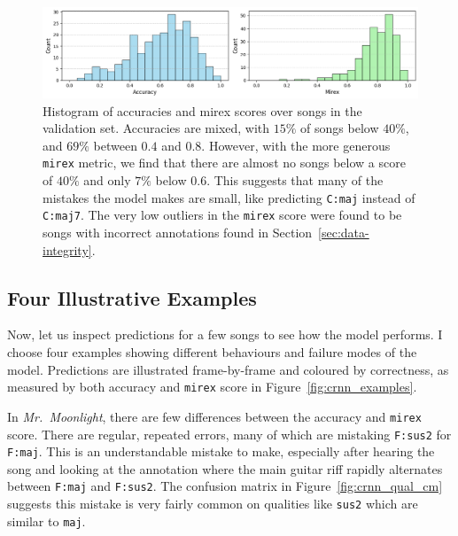 \begin{figure}[ht]
    \centering
    \includegraphics[width=1.0\textwidth]{figures/accuracy_mirex_histograms.png}
    \caption{Histogram of accuracies and mirex scores over songs in the validation set. Accuracies are mixed, with $15\%$ of songs below $40\%$, and $69\%$ between $0.4$ and $0.8$. However, with the more generous \texttt{mirex} metric, we find that there are almost no songs below a score of $40\%$ and only $7\%$ below $0.6$. This suggests that many of the mistakes the model makes are small, like predicting \texttt{C:maj} instead of \texttt{C:maj7}. The very low outliers in the \texttt{mirex} score were found to be songs with incorrect annotations found in Section~\ref{sec:data-integrity}.}\label{fig:crnn_song_hist}
\end{figure}

\subsection{Four Illustrative Examples}\label{sec:crnn_examples}

Now, let us inspect predictions for a few songs to see how the model performs. I choose four examples showing different behaviours and failure modes of the model. Predictions are illustrated frame-by-frame and coloured by correctness, as measured by both accuracy and \texttt{mirex} score in Figure~\ref{fig:crnn_examples}. 

In \emph{Mr.\ Moonlight}, there are few differences between the accuracy and \texttt{mirex} score. There are regular, repeated errors, many of which are mistaking \texttt{F:sus2} for \texttt{F:maj}. This is an understandable mistake to make, especially after hearing the song and looking at the annotation where the main guitar riff rapidly alternates between \texttt{F:maj} and \texttt{F:sus2}. The confusion matrix in Figure~\ref{fig:crnn_qual_cm} suggests this mistake is very fairly common on qualities like \texttt{sus2} which are similar to \texttt{maj}. 

